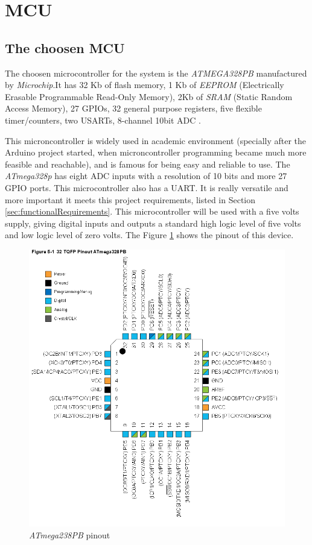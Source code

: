 \section{MCU}\label{sec:mcu-hw}

		\subsection{The choosen MCU}\label{ssec:the-choosen-mcu}

		The choosen microcontroller for the system is the \textit{ATMEGA328PB} manufactured by \textit{Microchip}.It has 32 Kb of flash memory, 1 Kb of \textit{EEPROM} (Electrically Erasable Programmable Read-Only Memory), 2Kb of \textit{SRAM} (Static Random Access Memory), 27 GPIOs, 32 general purpose registers, five flexible timer/counters, two USARTs, 8-channel 10bit ADC \cite{atmega328p-datasheet}. 
		\par
		This microncontroller is widely used in academic environment (specially after the Arduino project started, when microncontroller programming became much more feasible and reachable), and is famous for being easy and reliable to use. The \textit{ATmega328p} has eight ADC inputs with a resolution of 10 bits and more 27 GPIO ports. This microcontroller also has a UART. It is really versatile and more important it meets this project requirements, listed in Section \ref{sec:functionalRequirements}. This microcontroller will be used with a five volts supply, giving digital inputs and outputs a standard high logic level of five volts and low logic level of zero volts. The Figure \ref{fig:atmega328pb} shows the pinout of this device.

		\begin{figure}[htbp]
			\centering
			\includegraphics[scale=0.5]{figuras/fig-atmega328pb.png}
			\caption{\textit{ATmega238PB} pinout \cite{atmega328p-datasheet}}
			\label{fig:atmega328pb}
		\end{figure}
		

